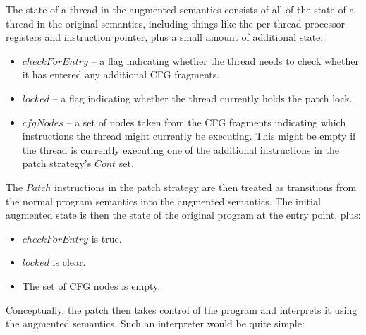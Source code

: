 The state of a thread in the augmented semantics consists of all of
the state of a thread in the original semantics, including things like
the per-thread processor registers and instruction pointer, plus a
small amount of additional state:

\begin{itemize}
\item $checkForEntry$ -- a flag indicating whether the thread needs to
  check whether it has entered any additional CFG fragments.
\item $locked$ -- a flag indicating whether the thread currently holds
  the patch lock.
\item $\mathit{cfgNodes}$ -- a set of nodes taken from the CFG fragments
  indicating which instructions the thread might currently be
  executing.  This might be empty if the thread is currently executing
  one of the additional instructions in the patch strategy's $Cont$
  set.
\end{itemize}

The $Patch$ instructions in the patch strategy are then treated as
transitions from the normal program semantics into the augmented
semantics.  The initial augmented state is then the state of the
original program at the entry point, plus:

\begin{itemize}
\item $checkForEntry$ is true.
\item $locked$ is clear.
\item The set of CFG nodes is empty.
\end{itemize}

Conceptually, the patch then takes control of the program and
interprets it using the augmented semantics.  Such an interpreter
would be quite simple:

